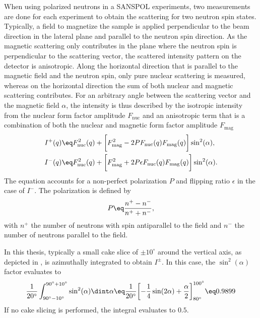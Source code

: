\documentclass[\main/dresen_thesis.tex]{subfiles}
\begin{document}
    When using polarized neutrons in a SANSPOL experiments, two measurements are done for each experiment to obtain the scattering for two neutron spin states.
    Typically, a field to magnetize the sample is applied perpendicular to the beam direction in the lateral plane and parallel to the neutron spin direction.
    As the magnetic scattering only contributes in the plane where the neutron spin is perpendicular to the scattering vector, the scattered intensity pattern on the detector is anisotropic.
    Along the horizontal direction that is parallel to the magnetic field and the neutron spin, only pure nuclear scattering is measured, whereas on the horizontal direction the sum of both nuclear and magnetic scattering contributes.
    For an arbitrary angle between the scattering vector and the magnetic field $\alpha$, the intensity is thus described by the isotropic intensity from the nuclear form factor amplitude $F_\mathrm{nuc}$ and an anisotropic term that is a combination of both the nuclear and magnetic form factor amplitude $F_\mathrm{mag}$ \cite{Wiedenmann_2001_Small, Kohlbrecher_1997_Magne}
    \begin{align}
      \label{eq:methods:sans:sanspolFormula}
      I^+(q)
        &\eq F^2_\mathrm{nuc}(q) + \biggl[ F^2_\mathrm{mag} - 2 P F_\mathrm{nuc}(q) F_\mathrm{mag}(q) \biggr] \sin^2(\alpha),\\
      I^-(q)
        &\eq F^2_\mathrm{nuc}(q) + \biggl[ F^2_\mathrm{mag} + 2 P \epsilon F_\mathrm{nuc}(q) F_\mathrm{mag}(q) \biggr] \sin^2(\alpha).
    \end{align}
    The equation accounts for a non-perfect polarization $P$ and flipping ratio $\epsilon$ in the case of $I^-$.
    The polarization is defined by
    \begin{align}
      P \eq \frac{n^+ - n^-}{n^+ + n^-},
    \end{align}
    with $n^+$ the number of neutrons with spin antiparallel to the field and $n^-$ the number of neutrons parallel to the field.

    In this thesis, typically a small cake slice of $\pm 10^\circ$ around the vertical axis, as depicted in , is azimuthally integrated to obtain $I^\pm$.
    In this case, the $\sin^2(\alpha)$ factor evaluates to
    \begin{align}
      \frac{1}{20^\circ} \int_{90^\circ-10^\circ}^{90^\circ+10^\circ} \sin^2(\alpha) \dint \alpha \eq
        \frac{1}{20^\circ} \biggl[ -\frac{1}{4}\sin(2\alpha)+\frac{\alpha}{2} \biggr]_{80^\circ}^{100^\circ} \eq
        0.9899
    \end{align}
    If no cake slicing is performed, the integral evaluates to $0.5$.
\end{document}
